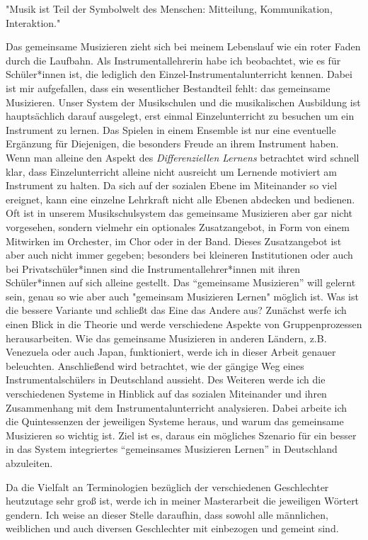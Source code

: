 
"Musik ist Teil der Symbolwelt des Menschen: Mitteilung, Kommunikation,
Interaktion." \autocite[91]{doerne:umfassend_musizieren}

Das gemeinsame Musizieren zieht sich bei meinem Lebenslauf wie ein roter Faden
durch die Laufbahn. Als Instrumentallehrerin habe ich beobachtet, wie es für
Schüler*innen ist, die lediglich den Einzel-Instrumentalunterricht kennen. Dabei
ist mir aufgefallen, dass ein wesentlicher Bestandteil fehlt: das gemeinsame
Musizieren. Unser System der Musikschulen und die musikalischen Ausbildung ist
hauptsächlich darauf ausgelegt, erst einmal Einzelunterricht zu besuchen um ein
Instrument zu lernen. Das Spielen in einem Ensemble ist nur eine eventuelle
Ergänzung für Diejenigen, die besonders Freude an ihrem Instrument haben. Wenn
man alleine den Aspekt des
\emph{Differenziellen Lernens}
betrachtet wird schnell klar, dass Einzelunterricht alleine nicht ausreicht um
Lernende motiviert am Instrument zu halten. Da sich auf der sozialen Ebene im
Miteinander so viel ereignet, kann eine einzelne Lehrkraft nicht alle Ebenen
abdecken und bedienen. Oft ist in unserem Musikschulsystem das gemeinsame
Musizieren aber gar nicht vorgesehen, sondern vielmehr ein optionales
Zusatzangebot, in Form von einem Mitwirken im Orchester, im Chor oder in der
Band. Dieses Zusatzangebot ist aber auch nicht immer gegeben; besonders bei
kleineren Institutionen oder auch bei Privatschüler*innen sind die
Instrumentallehrer*innen mit ihren Schüler*innen auf sich alleine gestellt. Das
\enquote{gemeinsame Musizieren} will gelernt sein, genau so wie aber auch
"gemeinsam Musizieren Lernen" möglich ist. Was ist die bessere Variante und
schließt das Eine das Andere aus? Zunächst werfe ich einen Blick in die Theorie
und werde verschiedene Aspekte von Gruppenprozessen herausarbeiten. Wie das
gemeinsame Musizieren in anderen Ländern, z.B. Venezuela oder auch Japan,
funktioniert, werde ich in dieser Arbeit genauer beleuchten. Anschließend wird
betrachtet, wie der gängige Weg eines Instrumentalschülers in Deutschland
aussieht. Des Weiteren werde ich die verschiedenen Systeme in Hinblick auf das
sozialen Miteinander und ihren Zusammenhang mit dem Instrumentalunterricht
analysieren. Dabei arbeite ich die Quintessenzen der jeweiligen Systeme heraus,
und warum das gemeinsame Musizieren so wichtig ist. Ziel ist es, daraus ein
mögliches Szenario für ein besser in das System integriertes
\enquote{gemeinsames Musizieren Lernen} in Deutschland abzuleiten.


Da die Vielfalt an Terminologien bezüglich der verschiedenen Geschlechter
heutzutage sehr groß ist, werde ich in meiner Masterarbeit die jeweiligen
Wörtert gendern. Ich weise an dieser Stelle daraufhin, dass sowohl alle
männlichen, weiblichen und auch diversen Geschlechter mit einbezogen und gemeint
sind. 
